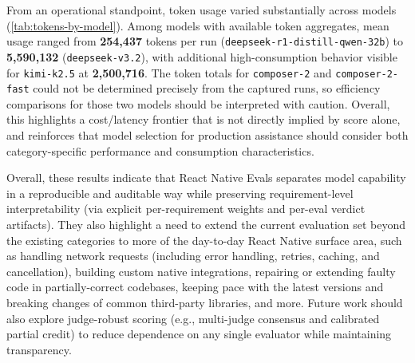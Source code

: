 \documentclass[11pt]{article}
\begin{document}
From an operational standpoint, token usage varied substantially across models (\cref{tab:tokens-by-model}). Among models with available token aggregates, mean usage ranged from \textbf{254,437} tokens per run (\texttt{deepseek-r1-distill-qwen-32b}) to \textbf{5,590,132} (\texttt{deepseek-v3.2}), with additional high-consumption behavior visible for \texttt{kimi-k2.5} at \textbf{2,500,716}. The token totals for \texttt{composer-2} and \texttt{composer-2-fast} could not be determined precisely from the captured runs, so efficiency comparisons for those two models should be interpreted with caution. Overall, this highlights a cost/latency frontier that is not directly implied by score alone, and reinforces that model selection for production assistance should consider both category-specific performance and consumption characteristics.

Overall, these results indicate that React Native Evals separates model capability in a reproducible and auditable way while preserving requirement-level interpretability (via explicit per-requirement weights and per-eval verdict artifacts). They also highlight a need to extend the current evaluation set beyond the existing categories to more of the day-to-day React Native surface area, such as handling network requests (including error handling, retries, caching, and cancellation), building custom native integrations, repairing or extending faulty code in partially-correct codebases, keeping pace with the latest versions and breaking changes of common third-party libraries, and more. Future work should also explore judge-robust scoring (e.g., multi-judge consensus and calibrated partial credit) to reduce dependence on any single evaluator while maintaining transparency.



\end{document}
